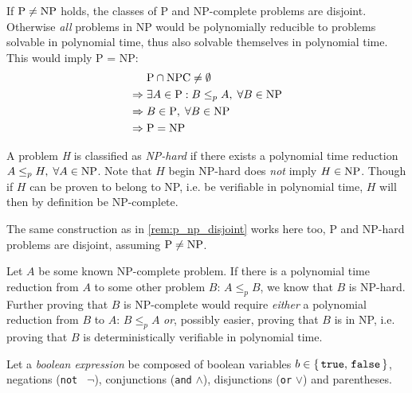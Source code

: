 \begin{remark}\label{rem:p_np_disjoint}
	If \(\text{P} \neq \text{NP}\) holds, the classes of P and NP-complete problems are disjoint. Otherwise \emph{all} problems in NP would be polynomially reducible to problems solvable in polynomial time, thus also solvable themselves in polynomial time. This would imply P = NP:
	\begin{align*}
		& \text{P} \cap \text{NPC} \neq \emptyset \\
		\Rightarrow \; & \exists A \in \text{P} : B \leq_p A, \; \forall B \in \text{NP} \\
		\Rightarrow \; & B \in \text{P}, \; \forall B \in \text{NP} \\
		\Rightarrow \; & \text{P} = \text{NP}
	\end{align*}
\end{remark}

\begin{definition}\label{def:np_hard}
	A problem \emph{H} is classified as \emph{NP-hard} if there exists a polynomial time reduction \(A \leq_p H, \; \forall A \in \text{NP}\). 
	Note that \(H\) begin NP-hard does \emph{not} imply \(H \in \text{NP}\). 
	Though if \(H\) can be proven to belong to NP, i.e. be verifiable in polynomial time, \(H\) will then by definition be NP-complete.
\end{definition}

\begin{remark}\label{rem:p_np_hard_disjoint}
	The same construction as in \cref{rem:p_np_disjoint} works here too, P and NP-hard problems are disjoint, assuming \(\text{P} \neq \text{NP}\).
\end{remark}

\begin{remark}\label{note:npc_proving}
	Let \(A\) be some known NP-complete problem. 
	If there is a polynomial time reduction from \(A\) to some other problem \(B\): \(A \leq_p B\), we know that \(B\) is NP-hard. 
	Further proving that \(B\) is NP-complete would require \emph{either} a polynomial reduction from \(B\) to \(A\): \(B \leq_p A\) \emph{or}, possibly easier, proving that \(B\) is in NP, i.e. proving that \(B\) is deterministically verifiable in polynomial time.
\end{remark}

Let a \emph{boolean expression} be composed of boolean variables \(b \in \set{\texttt{true},\, \texttt{false}}\), negations (\texttt{not } \(\neg\)), conjunctions (\texttt{and} \(\land\)), disjunctions (\texttt{or} \(\lor\)) and parentheses.

